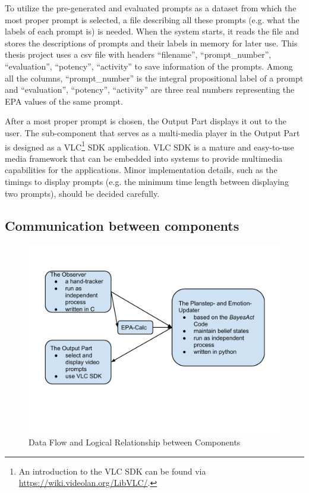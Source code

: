 To utilize the pre-generated and evaluated prompts as a dataset from which the most proper prompt is selected, a file describing all these prompts (e.g. what the labels of each prompt is) is needed. When the system starts, it reads the file and stores the descriptions of prompts and their labels in memory for later use. This thesis project uses a csv file with headers ``filename'', ``prompt\_number'', ``evaluation'', ``potency'', ``activity'' to save information of the prompts. Among all the columns, ``prompt\_number'' is the integral propositional label of a prompt and ``evaluation'', ``potency'', ``activity'' are three real numbers representing the EPA values of the same prompt. 

After a most proper prompt is chosen, the Output Part displays it out to the user. The sub-component that serves as a multi-media player in the Output Part is designed as a VLC\footnote{An introduction to the VLC SDK can be found via \url{https://wiki.videolan.org/LibVLC/}.} SDK application. VLC SDK is a mature and easy-to-use media framework that can be embedded into systems to provide multimedia capabilities for the applications. Minor implementation details, such as the timings to display prompts (e.g. the minimum time length between displaying two prompts), should be decided carefully.

\subsection{Communication between components}

\begin{figure}[h!]
\centering
\includegraphics[width=0.9\linewidth]{fig-dataflow.pdf}
\caption{Data Flow and Logical Relationship between Components}
\label{fig:dataflow}
\end{figure}

